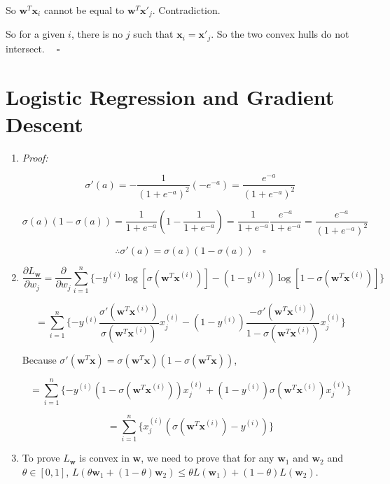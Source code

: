 \documentclass[paper=letter, fontsize=12pt]{article}
\begin{document}
So $\mathbf{w}^T \mathbf{x}_i$ cannot be equal to $\mathbf{w}^T \mathbf{x'}_j$. Contradiction.

So for a given $i$, there is no $j$ such that $\mathbf{x}_i = \mathbf{x'}_j$. So the two convex hulls do not intersect. $\ \ \ \ \square$

\section{Logistic Regression and Gradient Descent}

\begin{enumerate}[label=(\alph*)]

	\item 
	
	\textit{Proof:}
	
	$$\sigma'(a) = - \frac{1}{(1 + e^{-a})^2} (-e^{-a}) = \frac{e^{-a}}{(1 + e^{-a})^2}$$
	
	$$\sigma(a)(1 - \sigma(a)) = \frac{1}{1 + e^{-a}} (1 - \frac{1}{1 + e^{-a}}) = \frac{1}{1 + e^{-a}} \frac{e^{-a}}{1 + e^{-a}} = \frac{e^{-a}}{(1 + e^{-a})^2}$$
	
	$$\therefore \sigma'(a) = \sigma(a)(1 - \sigma(a)) \ \ \ \ \square$$
	
	\item 
	
	$$\frac{\partial L_{\mathbf{w}}}{\partial w_j} = \frac{\partial }{\partial w_j} \sum_{i = 1}^{n}\{-y^{(i)} \log[\sigma(\mathbf{w}^T \mathbf{x}^{(i)})] - (1 - y^{(i)}) \log[1 - \sigma(\mathbf{w}^T \mathbf{x}^{(i)})] \} $$
	
	$$= \sum_{i = 1}^{n} \{-y^{(i)} \frac{\sigma'(\mathbf{w}^T \mathbf{x}^{(i)})}{\sigma(\mathbf{w}^T \mathbf{x}^{(i)})} x^{(i)}_j - (1 - y^{(i)}) \frac{-\sigma'(\mathbf{w}^T \mathbf{x}^{(i)})}{1 - \sigma(\mathbf{w}^T \mathbf{x}^{(i)}) } x^{(i)}_j \}$$
	
	Because $\sigma'(\mathbf{w}^T \mathbf{x}) = \sigma(\mathbf{w}^T \mathbf{x}) (1 - \sigma(\mathbf{w}^T \mathbf{x}) )$,
	
	$$= \sum_{i = 1}^{n} \{-y^{(i)} (1 - \sigma(\mathbf{w}^T \mathbf{x}^{(i)})) x^{(i)}_j + (1 - y^{(i)}) \sigma(\mathbf{w}^T \mathbf{x}^{(i)}) x^{(i)}_j \}$$
	
	$$= \sum_{i = 1}^{n} \{ x^{(i)}_j (\sigma(\mathbf{w}^T \mathbf{x}^{(i)}) - y^{(i)}) \}$$
	
	\item To prove $L_{\mathbf{w}}$ is convex in $\mathbf{w}$, we need to prove that for any $\mathbf{w}_1$ and $\mathbf{w}_2$ and $\theta \in [0, 1]$, $L(\theta \mathbf{w}_1 + (1- \theta) \mathbf{w}_2) \leq \theta L(\mathbf{w}_1) + (1 - \theta) L(\mathbf{w}_2)$.
	

\end{enumerate}
\end{document}

